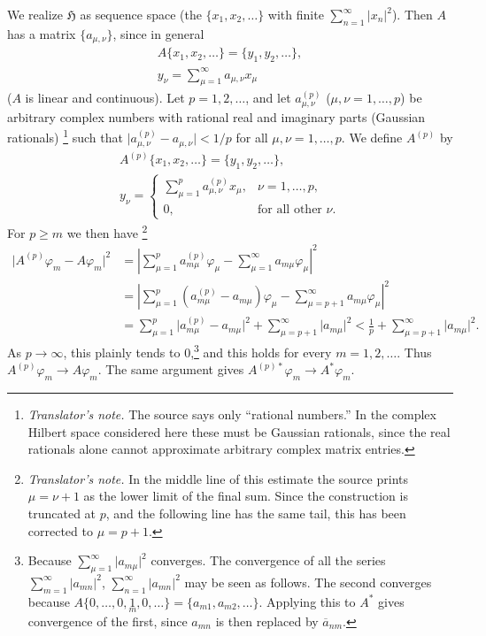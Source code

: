 \documentclass[
  paper=b5,
  twoside=true,
  fontsize=13pt,
  headings=normal,
  bookmarkpackage=false
]{scrartcl}
\theoremstyle{definition}
\newcounter{translatornote}
\newcounter{savedfootnote}
\newcommand{\TranslatorNote}[1]{%
  \stepcounter{translatornote}%
  \setcounter{savedfootnote}{\value{footnote}}%
  \begingroup
    \renewcommand{\thefootnote}{T\arabic{translatornote}}%
    \footnote{\textit{Translator's note.} #1}%
  \endgroup
  \setcounter{footnote}{\value{savedfootnote}}}
\begin{document}
We realize \(\mathfrak H\) as sequence space (the
\(\{x_1,x_2,\ldots\}\) with finite
\(\sum_{n=1}^{\infty}\lvert x_n\rvert^2\)).  Then \(A\) has a matrix
\(\{a_{\mu,\nu}\}\), since in general
\begin{gather*}
  A\{x_1,x_2,\ldots\}=\{y_1,y_2,\ldots\},\\
  y_\nu=\sum_{\mu=1}^{\infty}a_{\mu,\nu}x_\mu
\end{gather*}
(\(A\) is linear and continuous).  Let \(p=1,2,\ldots\), and let
 \(a_{\mu,\nu}^{(p)}\) (\(\mu,\nu=1,\ldots,p\)) be arbitrary complex
numbers with rational real and imaginary parts (Gaussian rationals)\TranslatorNote{The
source says only “rational numbers.” In the complex Hilbert space
considered here these must be Gaussian rationals, since the real
rationals alone cannot approximate arbitrary complex matrix entries.}
such that \(\lvert a_{\mu,\nu}^{(p)}-a_{\mu,\nu}\rvert<1/p\) for all
\(\mu,\nu=1,\ldots,p\). We define \(A^{(p)}\) by
\begin{gather*}
  A^{(p)}\{x_1,x_2,\ldots\}=\{y_1,y_2,\ldots\},\\
  y_\nu=
  \begin{cases}
    \displaystyle\sum_{\mu=1}^{p}a_{\mu,\nu}^{(p)}x_\mu,
      &\nu=1,\ldots,p,\\
    0,&\text{for all other \(\nu\).}
  \end{cases}
\end{gather*}
For \(p\geq m\) we then have\TranslatorNote{In the middle line of this
estimate the source prints \(\mu=\nu+1\) as the lower limit of the final
sum.  Since the construction is truncated at \(p\), and the following
line has the same tail, this has been corrected to \(\mu=p+1\).}
\begin{align*}
  \lvert A^{(p)}\varphi_m-A\varphi_m\rvert^2
  &=
  \left\lvert
    \sum_{\mu=1}^{p}a_{m\mu}^{(p)}\varphi_\mu
    -\sum_{\mu=1}^{\infty}a_{m\mu}\varphi_\mu
  \right\rvert^2                                                   \\
  &=
  \left\lvert
    \sum_{\mu=1}^{p}
      (a_{m\mu}^{(p)}-a_{m\mu})\varphi_\mu
    -\sum_{\mu=p+1}^{\infty}a_{m\mu}\varphi_\mu
  \right\rvert^2                                                   \\
  &=
  \sum_{\mu=1}^{p}\lvert a_{m\mu}^{(p)}-a_{m\mu}\rvert^2
  +\sum_{\mu=p+1}^{\infty}\lvert a_{m\mu}\rvert^2
  <\frac1p+\sum_{\mu=p+1}^{\infty}\lvert a_{m\mu}\rvert^2.
\end{align*}
As \(p\to\infty\), this plainly tends to
\(0\),\footnote{\label{fn:39}Because
\(\sum_{\mu=1}^{\infty}\lvert a_{m\mu}\rvert^2\) converges.  The
convergence of all the series
\(\sum_{m=1}^{\infty}\lvert a_{mn}\rvert^2\),
\(\sum_{n=1}^{\infty}\lvert a_{mn}\rvert^2\) may be seen as follows.
The second converges because
\(A\{0,\ldots,0,\underset{m}{1},0,\ldots\}
 =\{a_{m1},a_{m2},\ldots\}\). Applying this to \(A^*\) gives convergence
of the first, since \(a_{mn}\) is then replaced by \(\overline a_{nm}\).}
and this holds for every \(m=1,2,\ldots\). Thus
\(A^{(p)}\varphi_m\to A\varphi_m\). The same argument gives
\(A^{(p)*}\varphi_m\to A^*\varphi_m\).
\end{document}
